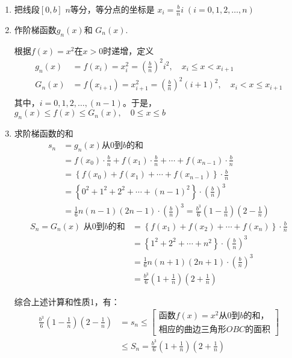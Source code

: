 \begin{solution}
\begin{enumerate}
    \item 把线段$[0,b]$ $n$等分，等分点的坐标是
   $ x_i=\frac{b}{n}i\;  (i=0, 1, 2,\ldots,n)$ 
   \item 作阶梯函数$g_n(x)$和
    $G_n (x)$.

    根据$f(x)=x^2$在$x>0$时递增，定义
\[\begin{split}
g_n(x)&=f(x_i)=x^2_i=\left(\frac{b}{n}\right)^2i^2,\quad x_i\le x<x_{i+1}\\
G_n(x)&=f(x_{i+1})=x^2_{i+1}=\left(\frac{b}{n}\right)^2(i+1)^2,\quad x_i<x\le x_{i+1}\\
\end{split}\]
其中，$i=0,1,2,\ldots,(n-1)$。于是，$g_n(x)\le f(x)\le G_n(x),\quad 0\le x\le b$

\item 求阶梯函数的和
\[\begin{split}
s_n&=g_n(x)\text{从0到$b$的和}\\
&=f\left(x_{0}\right) \cdot \frac{b}{n}+f\left(x_{1}\right) \cdot \frac{b}{n}+\cdots+f\left(x_{n-1}\right) \cdot \frac{b}{n}\\
&=\left\{f\left(x_{0}\right)+f\left(x_{1}\right)+\cdots+f\left(x_{n-1}\right)\right\} \cdot \frac{b}{n} \\
&=\left\{0^{2}+1^{2}+2^{2}+\cdots+(n-1)^{2}\right\} \cdot\left(\frac{b}{n}\right)^3\\
&=\frac{1}{6}n(n-1)(2 n-1) \cdot\left(\frac{b}{n}\right)^{3} =\frac{b^3}{6}\left(1-\frac{1}{n}\right)\left(2-\frac{1}{n}\right) 
\end{split}\]
\[\begin{split}
   S_{n}= G_{n}(x) \text { 从0到$b$的和}
   &= \left\{f\left(x_{1}\right)+f\left(x_{2}\right)+\cdots+f\left(x_{n}\right)\right\} \cdot \frac{b}{n} \\
   &=\left\{1^2+2^{2}+\cdots+n^{2}\right\} \cdot\left(\frac{b}{n}\right)^{3} \\
   &=\frac{1}{6}n(n+1)(2 n+1) \cdot\left(\frac{b}{n}\right)^{3} \\
   &=\frac{b^3}{6}\left(1+\frac{1}{n}\right)\left(2+\frac{1}{n}\right) 
\end{split}\]

综合上述计算和性质1，有：
\[\begin{split}
\frac{b^3}{6}\left(1-\frac{1}{n}\right)\left(2-\frac{1}{n}\right)&=s_n\le \begin{bmatrix}
\text{函数$f(x)=x^2$从0到$b$的和，}\\
\text{相应的曲边三角形$OBC$的面积}
\end{bmatrix}\\
&\le S_n=\frac{b^3}{6}\left(1+\frac{1}{n}\right)\left(2+\frac{1}{n}\right)
\end{split}\]


\end{enumerate}
\end{solution}
